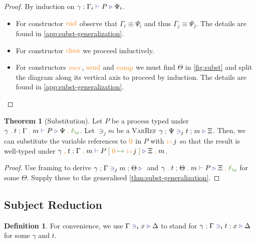 \documentclass[a4paper,UKenglish,cleveref,autoref,thm-restate,authorcolumns]{lipics-v2019}
\theoremstyle{definition}
\newtheorem{nidefinition}{Definition}
\newtheorem{nitheorem}{Theorem}
\newcommand{\type}[1]{\textcolor{BlueViolet}{\operatorname{#1}}}
\newcommand{\constr}[1]{\textcolor{BurntOrange}{\operatorname{#1}}}
\newcommand{\func}[1]{\textcolor{OliveGreen}{\operatorname{#1}}}
\newcommand{\suc}{\constr{\scriptstyle 1+}}
\newcommand{\comma}{\; \constr{,} \;}
\newcommand{\subst}[3]{#1 \; \func{[} \; #3 \; \func{\mapsto} \;#2 \; \func{]}}
\newcommand{\lz}{\func{\ell_{\o}}}
\newcommand{\types}[4]{#1 \; \type{;} \; #2 \; \type{\vdash} \; #3 \; \type{\triangleright} \; #4}
\newcommand{\contains}[6]{#1 \; \type{;} \; #2 \; \type{\ni}_{#3} \; #4 \; \type{;} \; #5 \; \type{\triangleright} \; #6}
\newcommand{\containsusage}[4]{#1 \; \type{\ni}_{#2} \; #3 \; \type{\triangleright} \; #4}
\begin{document}
\begin{proof}
  By induction on $\types{\gamma}{\Gamma_i}{P}{\Psi_i}$.
  \begin{itemize}
    \item
      For constructor $\constr{end}$ observe that $\Gamma_i \equiv \Psi_i$ and thus $\Gamma_j \equiv \Psi_j$.
      The details are found in \autoref{app:subst-generalization}.

    \item
      For constructor $\constr{chan}$ we proceed inductively.
      
    \item
      For constructors $\constr{recv}$, $\constr{send}$ and $\constr{comp}$ we must find $\Theta$ in \autoref{fig:subst} and split the diagram along its vertical axis to proceed by induction.
      The details are found in \autoref{app:subst-generalization}.
  \end{itemize}  
\end{proof}

\begin{nitheorem}[Substitution]
  \label{thm:substitution}
  Let $P$ be a process typed under $\types{\gamma \comma t}{\Gamma \comma m}{P}{\Psi \comma \lz}$.
  Let $\ni_j m$ be a \textsc{VarRef} $\contains{\gamma}{\Psi}{j}{t}{m}{\Xi}$.
  Then, we can substitute the variable references to $\constr{0}$ in $P$ with $\suc j$ so that the result is well-typed under $\types{\gamma \comma t}{\Gamma \comma m}{\subst{P}{\suc j}{\constr{0}}}{\Xi \comma m}$.
\end{nitheorem}
\begin{proof}
  Use framing to derive $\contains{\gamma}{\Gamma}{j}{m}{\Theta}$ and $\types{\gamma \comma t}{\Theta \comma m}{P}{\Xi \comma \lz}$ for some $\Theta$.
  Supply these to the generalised \autoref{thm:subst-generalization}.
\end{proof}

\subsection{Subject Reduction}
\label{subject-reduction}

\begin{nidefinition}
  For convenience, we use $\containsusage{\Gamma}{i}{x}{\Delta}$ to stand for $\contains{\gamma}{\Gamma}{i}{t}{x}{\Delta}$ for some $\gamma$ and $t$.
\end{nidefinition}
\end{document}
